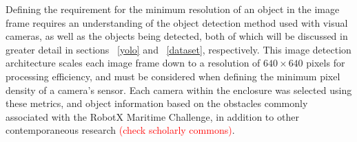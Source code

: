 \documentclass{erauthesis}
\begin{document}
Defining the requirement for the minimum resolution of an object in the image frame requires an understanding of the object detection method used with visual cameras, as well as the objects being detected, both of which will be discussed in greater detail in sections ~\ref{yolo} and ~\ref{dataset}, respectively.
This image detection architecture scales each image frame down to a resolution of $640 \times 640$ pixels for processing efficiency, and must be considered when defining the minimum pixel density of a camera's sensor.
Each camera within the enclosure was selected using these metrics, and object information based on the obstacles commonly associated with the RobotX Maritime Challenge, in addition to other contemporaneous research \cite{thompson2023} \textcolor{red}{(check scholarly commons)}.


\end{document}
